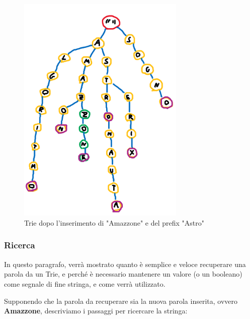 \documentclass[a4paper, 12pt]{article}
\begin{document}
\begin{figure}[ht!]
    \centering
    \includegraphics[width=8cm]{Images/trie dopo inserimento.png}
    \caption{Trie dopo l'inserimento di "Amazzone" e del prefix "Astro"}
    \label{fig:my_label}
\end{figure}

\clearpage

\subsubsection{Ricerca}
In questo paragrafo, verrà mostrato quanto è semplice e veloce recuperare una parola da un Trie, e perché è necessario mantenere un valore (o un booleano) come segnale di fine stringa, e come verrà utilizzato.

Supponendo che la parola da recuperare sia la nuova parola inserita, ovvero \textbf{Amazzone}, descriviamo i passaggi per ricercare la stringa:
\end{document}
